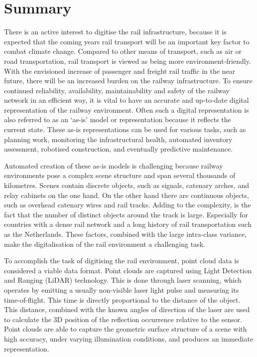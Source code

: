 \chapter{Summary}
There is an active interest to digitise the rail infrastructure, because it is expected that the coming years rail transport will be an important key factor to combat climate change. Compared to other means of transport, such as air or road transportation, rail transport is viewed as being more environment-friendly. With the envisioned increase of passenger and freight rail traffic in the near future, there will be an increased burden on the railway infrastructure. To ensure continued reliability, availability, maintainability and safety of the railway network in an efficient way, it is vital to have an accurate and up-to-date digital representation of the railway environment. Often such a digital representation is also referred to as an `as-is' model or representation because it reflects the current state. These as-is representations can be used for various tasks, such as planning work, monitoring the infrastructural health, automated inventory assessment, robotised construction, and eventually predictive maintenance.

Automated creation of these as-is models is challenging because railway environments pose a complex scene structure and span several thousands of kilometres. Scenes contain discrete objects, such as signals, catenary arches, and relay cabinets on the one hand. On the other hand there are continuous objects, such as overhead catenary wires and rail tracks. Adding to the complexity, is the fact that the number of distinct objects around the track is large. Especially for countries with a dense rail network and a long history of rail transportation such as the Netherlands. These factors, combined with the large intra-class variance, make the digitalisation of the rail environment a challenging task.

To accomplish the task of digitising the rail environment, point cloud data is considered a viable data format. Point clouds are captured using Light Detection and Ranging (LiDAR) technology. This is done through laser scanning, which operates by emitting a usually non-visible laser light pulse and measuring its time-of-flight. This time is directly proportional to the distance of the object. This distance, combined with the known angles of direction of the laser are used to calculate the 3D position of the reflection occurrence relative to the sensor. Point clouds are able to capture the geometric surface structure of a scene with high accuracy, under varying illumination conditions, and produces an immediate representation.

